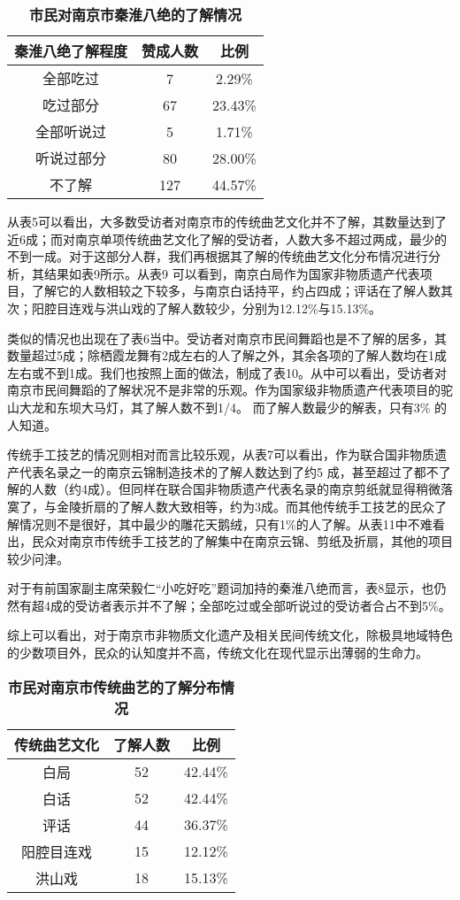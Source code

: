 \documentclass[12pt]{article}%
\begin{document}
\begin{table}[htbp]
  \centering
  \caption{\bf{市民对南京市秦淮八绝的了解情况}}
    \begin{tabular}{ccc}
    \hline
    秦淮八绝了解程度 & 赞成人数    & 比例 \\
    \hline
    全部吃过  & 7     & 2.29\% \\
    吃过部分  & 67    & 23.43\% \\
    全部听说过 & 5     & 1.71\% \\
    听说过部分 & 80    & 28.00\% \\
    不了解   & 127   & 44.57\% \\
    \hline
    \end{tabular}%
\end{table}%

从表5可以看出，大多数受访者对南京市的传统曲艺文化并不了解，其数量达到了近6成；而对南京单项传统曲艺文化了解的受访者，人数大多不超过两成，最少的不到一成。对于这部分人群，我们再根据其了解的传统曲艺文化分布情况进行分析，其结果如表9所示。从表9 可以看到，南京白局作为国家非物质遗产代表项目，了解它的人数相较之下较多，与南京白话持平，约占四成；评话在了解人数其次；阳腔目连戏与洪山戏的了解人数较少，分别为12.12\%与15.13\%。

类似的情况也出现在了表6当中。受访者对南京市民间舞蹈也是不了解的居多，其数量超过5成；除栖霞龙舞有2成左右的人了解之外，其余各项的了解人数均在1成左右或不到1成。我们也按照上面的做法，制成了表10。从中可以看出，受访者对南京市民间舞蹈的了解状况不是非常的乐观。作为国家级非物质遗产代表项目的驼山大龙和东坝大马灯，其了解人数不到1/4。 而了解人数最少的解表，只有3\% 的人知道。

传统手工技艺的情况则相对而言比较乐观，从表7可以看出，作为联合国非物质遗产代表名录之一的南京云锦制造技术的了解人数达到了约5 成，甚至超过了都不了解的人数（约4成）。但同样在联合国非物质遗产代表名录的南京剪纸就显得稍微落寞了，与金陵折扇的了解人数大致相等，约为3成。而其他传统手工技艺的民众了解情况则不是很好，其中最少的雕花天鹅绒，只有1\%的人了解。从表11中不难看出，民众对南京市传统手工技艺的了解集中在南京云锦、剪纸及折扇，其他的项目较少问津。

对于有前国家副主席荣毅仁“小吃好吃”题词加持的秦淮八绝而言，表8显示，也仍然有超4成的受访者表示并不了解；全部吃过或全部听说过的受访者合占不到5\%。

综上可以看出，对于南京市非物质文化遗产及相关民间传统文化，除极具地域特色的少数项目外，民众的认知度并不高，传统文化在现代显示出薄弱的生命力。

\begin{table}[htbp]
  \centering
  \caption{\bf{市民对南京市传统曲艺的了解分布情况}}
    \begin{tabular}{ccc}
    \hline
    传统曲艺文化  & 了解人数  & 比例 \\
    \hline
    白局    & 52    & 42.44\% \\
    白话    & 52    & 42.44\% \\
    评话    & 44    & 36.37\% \\
    阳腔目连戏 & 15    & 12.12\% \\
    洪山戏   & 18    & 15.13\% \\
    \hline
    \end{tabular}%
\end{table}%
\end{document}
